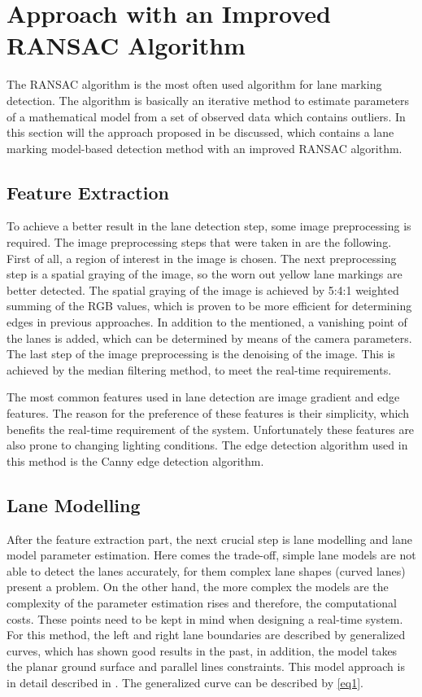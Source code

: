 \section{Approach with an Improved RANSAC Algorithm}

The RANSAC algorithm is the most often used algorithm for lane marking detection. The algorithm is basically an iterative method to estimate parameters of a mathematical model from a set of observed data which contains outliers. In this section will the approach proposed in \cite{ransac} be discussed, which contains a lane marking model-based detection method with an improved RANSAC algorithm.


\subsection{Feature Extraction}
To achieve a better result in the lane detection step, some image preprocessing is required. The image preprocessing steps that were taken in \cite{ransac} are the following. First of all, a region of interest in the image is chosen. The next preprocessing step is a spatial graying of the image, so the worn out yellow lane markings are better detected. The spatial graying of the image is achieved by 5:4:1 weighted summing of the RGB values, which is proven to be more efficient for determining edges in previous approaches. In addition to the mentioned, a vanishing point of the lanes is added, which can be determined by means of the camera parameters. The last step of the image preprocessing is the denoising of the image. This is achieved by the median filtering method, to meet the real-time requirements.

The most common features used in lane detection are image gradient and edge features. The reason for the preference of these features is their simplicity, which benefits the real-time requirement of the system. Unfortunately these features are also prone to changing lighting conditions. The edge detection algorithm used in this method is the Canny edge detection algorithm.


\subsection{Lane Modelling}
After the feature extraction part, the next crucial step is lane modelling and lane model parameter estimation. Here comes the trade-off, simple lane models are not able to detect the lanes accurately, for them complex lane shapes (curved lanes) present a problem. On the other hand, the more complex the models are the complexity of the parameter estimation rises and therefore, the computational costs. These points need to be kept in mind when designing a real-time system. For this method, the left and right lane boundaries are described by generalized curves, which has shown good results in the past, in addition, the model takes the planar ground surface and parallel lines constraints.  This model approach is in detail described in \cite{ransac1}. The generalized curve can be described by \ref{eq1}.

